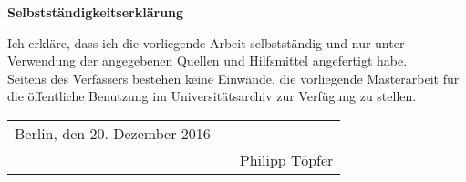 \begin{center}
{\sffamily \bfseries\Large Selbstständigkeitserklärung}\\
\end{center}%
\vspace{1cm}
%
Ich erkläre, dass ich die vorliegende Arbeit selbstständig und nur unter Verwendung der angegebenen Quellen und Hilfsmittel angefertigt habe.\\[0.2cm]
\noindent Seitens des Verfassers bestehen keine Einwände, die vorliegende Masterarbeit für die öffentliche Benutzung im Universitätsarchiv zur Verfügung zu stellen.\\[2cm]

\hspace{-1cm}
\begin{tabular}{p{5.5cm}p{2.5cm}c}
Berlin, den 20. Dezember 2016   && \hrulefill\\%
     && \hspace{1cm}Philipp Töpfer \hspace{1cm}
\end{tabular} 